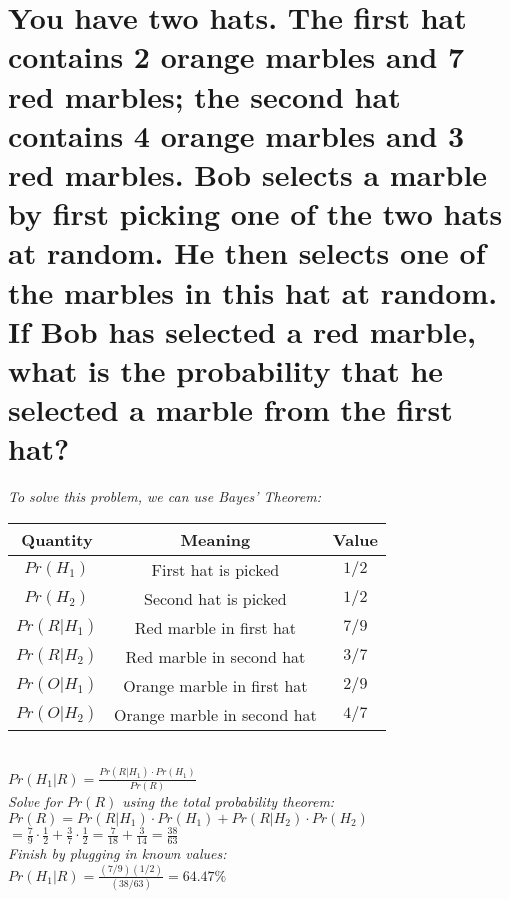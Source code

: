 \documentclass{article}
\begin{document}
\section{You have two hats. The first hat contains 2 orange marbles and 7 red marbles;
    the second hat contains 4 orange marbles and 3 red marbles. Bob selects a marble
    by first picking one of the two hats at random. He then selects one of the marbles in this hat
    at random. If Bob has selected a red marble, what is the probability that he selected a
    marble from the first hat?}
\hspace{1cm}\textit{To solve this problem, we can use Bayes' Theorem:}
\begin{center}
    \begin{tabular}{c|c|c}
        Quantity & Meaning & Value \\
        \hline
        $Pr(H_1)$ & First hat is picked & $1/2$ \\
        $Pr(H_2)$ & Second hat is picked & $1/2$ \\
        \hline
        $Pr(R|H_1)$ & Red marble in first hat & $7/9$ \\
        $Pr(R|H_2)$ & Red marble in second hat & $3/7$ \\
        $Pr(O|H_1)$ & Orange marble in first hat & $2/9$ \\
        $Pr(O|H_2)$ & Orange marble in second hat & $4/7$ \\
    \end{tabular} \\
    \vspace{0.25cm}
    $Pr(H_1|R) = \frac{Pr(R|H_1)\cdot Pr(H_1)}{Pr(R)}$ \\
    \vspace{0.25cm}
    \textit{Solve for $Pr(R)$ using the total probability theorem:} \\
    \vspace{0.25cm}
    $Pr(R) = Pr(R|H_1)\cdot Pr(H_1) + Pr(R|H_2)\cdot Pr(H_2)$ \\
    \vspace{0.25cm}
    $ = \frac{7}{9}\cdot \frac{1}{2} + \frac{3}{7}\cdot \frac{1}{2} = 
    \frac{7}{18} + \frac{3}{14} = \frac{38}{63}$ \\
    \vspace{0.25cm}
    \textit{Finish by plugging in known values:} \\
    \vspace{0.25cm}
    $ Pr(H_1|R) = \frac{(7/9)(1/2)}{(38/63)} = 64.47\%$ \\
    \vspace{0.25cm}
\end{center}
\clearpage
\end{document}
